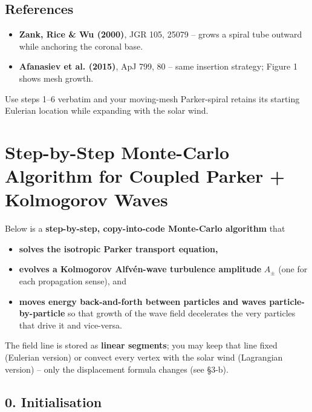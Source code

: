 \subsection*{References}

\begin{itemize}
\item \textbf{Zank, Rice \& Wu (2000)}, JGR 105, 25079 – grows a spiral tube outward while anchoring the coronal base.
\item \textbf{Afanasiev et al. (2015)}, ApJ 799, 80 – same insertion strategy; Figure 1 shows mesh growth.
\end{itemize}

\bigskip

\noindent
Use steps 1–6 verbatim and your moving-mesh Parker-spiral retains its starting Eulerian location while expanding with the solar wind.




\section{Step-by-Step Monte-Carlo Algorithm for Coupled Parker + Kolmogorov Waves}

Below is a \textbf{step-by-step, copy-into-code Monte-Carlo algorithm} that
\begin{itemize}
\item \textbf{solves the isotropic Parker transport equation,}
\item \textbf{evolves a Kolmogorov Alfvén-wave turbulence amplitude} $A_\pm$ (one for each propagation sense), and
\item \textbf{moves energy back-and-forth between particles and waves particle-by-particle} so that growth of the wave field decelerates the very particles that drive it and vice-versa.
\end{itemize}

The field line is stored as \textbf{linear segments}; you may keep that line fixed (Eulerian version) or convect every vertex with the solar wind (Lagrangian version) -- only the displacement formula changes (see \S 3-b).

\subsection*{0. Initialisation}

